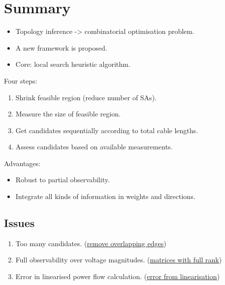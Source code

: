 \documentclass[
]{book}
\providecommand{\tightlist}{%
  \setlength{\itemsep}{0pt}\setlength{\parskip}{0pt}}
\begin{document}
\hypertarget{summary}{%
\section{Summary}\label{summary}}

\begin{itemize}
\tightlist
\item
  Topology inference -\textgreater{} combinatorial optimisation problem.
\item
  A new framework is proposed.
\item
  Core: local search heuristic algorithm.
\end{itemize}

Four steps:

\begin{enumerate}
\def\labelenumi{\arabic{enumi}.}
\tightlist
\item
  Shrink feasible region (reduce number of SAs).
\item
  Measure the size of feasible region.
\item
  Get candidates sequentially according to total cable lengths.
\item
  Assess candidates based on available measurements.
\end{enumerate}

Advantages:

\begin{itemize}
\tightlist
\item
  Robust to partial observability.
\item
  Integrate all kinds of information in weights and directions.
\end{itemize}

\hypertarget{issues}{%
\subsection*{Issues}\label{issues}}

\begin{enumerate}
\def\labelenumi{\arabic{enumi}.}
\tightlist
\item
  Too many candidates. (\protect\hyperlink{overlapping}{remove overlapping edges})
\item
  Full observability over voltage magnitudes. (\protect\hyperlink{BRM}{matrices with full
  rank})
\item
  Error in linearised power flow calculation. (\protect\hyperlink{error}{error from
  linearisation})
\end{enumerate}
\end{document}

